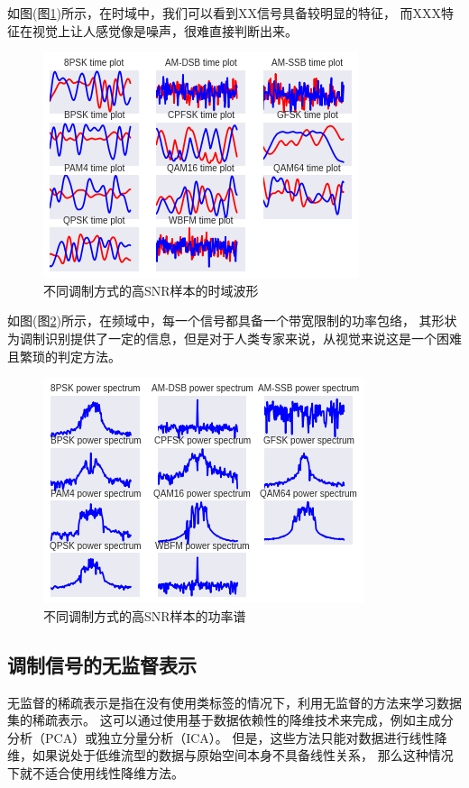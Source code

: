 如图(图\ref{sec:fig_3_1})所示，在时域中，我们可以看到XX信号具备较明显的特征，
而XXX特征在视觉上让人感觉像是噪声，很难直接判断出来。\par
\begin{figure}[!h]
	\centering
	\includegraphics[scale=0.9]{figures/chapter_3/signal_view_1}
	\caption{不同调制方式的高SNR样本的时域波形}\label{sec:fig_3_1}
\end{figure}

如图(图\ref{sec:fig_3_2})所示，在频域中，每一个信号都具备一个带宽限制的功率包络，
其形状为调制识别提供了一定的信息，但是对于人类专家来说，从视觉来说这是一个困难且繁琐的判定方法。\par
\begin{figure}[!h]
	\centering
	\includegraphics[scale=0.9]{figures/chapter_3/signal_view_2}
	\caption{不同调制方式的高SNR样本的功率谱}\label{sec:fig_3_2}
\end{figure}

\subsection{调制信号的无监督表示}

无监督的稀疏表示是指在没有使用类标签的情况下，利用无监督的方法来学习数据集的稀疏表示。
这可以通过使用基于数据依赖性的降维技术来完成，例如主成分分析（PCA）或独立分量分析（ICA）。
但是，这些方法只能对数据进行线性降维，如果说处于低维流型的数据与原始空间本身不具备线性关系，
那么这种情况下就不适合使用线性降维方法。\par

